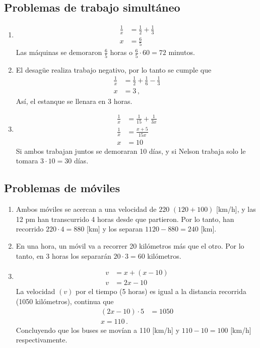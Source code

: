 \documentclass{sn-guia}
\begin{document}
\subsection{Problemas de trabajo simultáneo}
\begin{enumerate}
    \item \begin{align*}
        \frac{1}{x} &= \frac{1}{2} + \frac{1}{3} \\
        x &= \frac{6}{5}
    \end{align*}
    Las máquinas se demoraron $\frac{6}{5}$ horas o $\frac{6}{5}\cdot 60 = 72$ minutos. 
\item El desagüe realiza trabajo negativo, por lo tanto se cumple que
\begin{align*}
    \frac{1}{x} &= \frac{1}{2} + \frac{1}{6} - \frac{1}{3}\\
    x &= 3 \,,
\end{align*}
Así, el estanque se llenara en 3 horas.
\item \begin{align*}
    \frac{1}{x} &= \frac{1}{15} + \frac{1}{3x} \\
    \frac{1}{x} &= \frac{x+5}{15x} \\
    x &= 10 
\end{align*}
Si ambos trabajan juntos se demoraran 10 días, y si Nelson trabaja solo le tomara $3\cdot 10=30$ días.
\end{enumerate}
\subsection{Problemas de móviles}
\begin{enumerate}
    \item Ambos móviles se acercan a una velocidad de $220$ $(120+100)$ [km/h], y las 12 pm han transcurrido 4 
    horas desde que partieron. Por lo tanto, han recorrido $220\cdot 4=880$ [km] y los separan $1120-880=240$ [km]. 
    \item En una hora, un móvil va a recorrer 20 kilómetros más que el otro. Por lo tanto, en 3 horas los separarán 
    $20\cdot 3 = 60$ kilómetros.
    \item \begin{align*}
        v &= x + (x-10) \\
        v &= 2x - 10
    \end{align*}
    La velocidad $(v)$ por el tiempo (5 horas) es igual a la distancia recorrida (1050 kilómetros), continua que
    \begin{align*}
        (2x-10)\cdot 5 &= 1050 \\
        x = 110 \,.
    \end{align*}
    Concluyendo que los buses se movían a 110 [km/h] y $110-10=100$ [km/h] respectivamente.
\end{enumerate}
\end{document}
